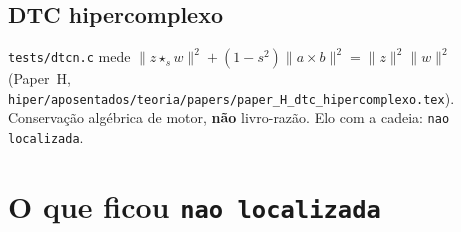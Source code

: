 \documentclass[11pt,a4paper]{article}
\newcommand{\code}[1]{\texttt{\small #1}}
\begin{document}
\subsection{DTC hipercomplexo}
\code{tests/dtcn.c} mede
$\lVert z\star_{s}w\rVert^{2}+(1-s^{2})\lVert a\times b\rVert^{2}
=\lVert z\rVert^{2}\lVert w\rVert^{2}$
(Paper~H, \code{hiper/aposentados/teoria/papers/paper\_H\_dtc\_hipercomplexo.tex}).
Conservação algébrica de motor, \textbf{não} livro-razão.
Elo com a cadeia: \texttt{nao localizada}.

\section{O que ficou \texttt{nao localizada}}\label{cripto:nao-localizada}
\end{document}
